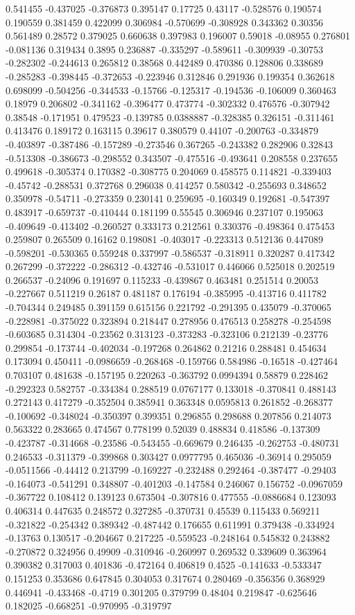 0.541455 -0.437025 -0.376873 0.395147 0.17725 0.43117 -0.528576 0.190574 0.190559 0.381459 0.422099 0.306984 -0.570699 -0.308928 0.343362 0.30356 0.561489 0.28572 0.379025 0.660638 0.397983 0.196007 0.59018 -0.08955 0.276801 -0.081136 0.319434 0.3895 0.236887 -0.335297 -0.589611 -0.309939 -0.30753 -0.282302 -0.244613 0.265812 0.38568 0.442489 0.470386 0.128806 0.338689 -0.285283 -0.398445 -0.372653 -0.223946 0.312846 0.291936 0.199354 0.362618 0.698099 -0.504256 -0.344533 -0.15766 -0.125317 -0.194536 -0.106009 0.360463 0.18979 0.206802 -0.341162 -0.396477 0.473774 -0.302332 0.476576 -0.307942 0.38548 -0.171951 0.479523 -0.139785 0.0388887 -0.328385 0.326151 -0.311461 0.413476 0.189172 0.163115 0.39617 0.380579 0.44107 -0.200763 -0.334879 -0.403897 -0.387486 -0.157289 -0.273546 0.367265 -0.243382 0.282906 0.32843 -0.513308 -0.386673 -0.298552 0.343507 -0.475516 -0.493641 0.208558 0.237655 0.499618 -0.305374 0.170382 -0.308775 0.204069 0.458575 0.114821 -0.339403 -0.45742 -0.288531 0.372768 0.296038 0.414257 0.580342 -0.255693 0.348652 0.350978 -0.54711 -0.273359 0.230141 0.259695 -0.160349 0.192681 -0.547397 0.483917 -0.659737 -0.410444 0.181199 0.55545 0.306946 0.237107 0.195063 -0.409649 -0.413402 -0.260527 0.333173 0.212561 0.330376 -0.498364 0.475453 0.259807 0.265509 0.16162 0.198081 -0.403017 -0.223313 0.512136 0.447089 -0.598201 -0.530365 0.559248 0.337997 -0.586537 -0.318911 0.320287 0.417342 0.267299 -0.372222 -0.286312 -0.432746 -0.531017 0.446066 0.525018 0.202519 0.266537 -0.24096 0.191697 0.115233 -0.439867 0.463481 0.251514 0.20053 -0.227667 0.511219 0.26187 0.481187 0.176194 -0.385995 -0.413716 0.411782 -0.704344 0.249485 0.391159 0.615156 0.221792 -0.291395 0.435079 -0.370065 -0.228981 -0.375022 0.323894 0.218447 0.278956 0.476513 0.258278 -0.254598 -0.603685 0.314304 -0.23562 0.313123 -0.373283 -0.323106 0.212139 -0.23776 0.299854 -0.173744 -0.402034 -0.197268 0.264862 0.21216 0.288481 0.454634 0.173094 0.450411 -0.0986659 -0.268468 -0.159766 0.584986 -0.16518 -0.427464 0.703107 0.481638 -0.157195 0.220263 -0.363792 0.0994394 0.58879 0.228462 -0.292323 0.582757 -0.334384 0.288519 0.0767177 0.133018 -0.370841 0.488143 0.272143 0.417279 -0.352504 0.385941 0.363348 0.0595813 0.261852 -0.268377 -0.100692 -0.348024 -0.350397 0.399351 0.296855 0.298688 0.207856 0.214073 0.563322 0.283665 0.474567 0.778199 0.52039 0.488834 0.418586 -0.137309 -0.423787 -0.314668 -0.23586 -0.543455 -0.669679 0.246435 -0.262753 -0.480731 0.246533 -0.311379 -0.399868 0.303427 0.0977795 0.465036 -0.36914 0.295059 -0.0511566 -0.44412 0.213799 -0.169227 -0.232488 0.292464 -0.387477 -0.29403 -0.164073 -0.541291 0.348807 -0.401203 -0.147584 0.246067 0.156752 -0.0967059 -0.367722 0.108412 0.139123 0.673504 -0.307816 0.477555 -0.0886684 0.123093 0.406314 0.447635 0.248572 0.327285 -0.370731 0.45539 0.115433 0.569211 -0.321822 -0.254342 0.389342 -0.487442 0.176655 0.611991 0.379438 -0.334924 -0.13763 0.130517 -0.204667 0.217225 -0.559523 -0.248164 0.545832 0.243882 -0.270872 0.324956 0.49909 -0.310946 -0.260997 0.269532 0.339609 0.363964 0.390382 0.317003 0.401836 -0.472164 0.406819 0.4525 -0.141633 -0.533347 0.151253 0.353686 0.647845 0.304053 0.317674 0.280469 -0.356356 0.368929 0.446941 -0.433468 -0.4719 0.301205 0.379799 0.48404 0.219847 -0.625646 0.182025 -0.668251 -0.970995 -0.319797 